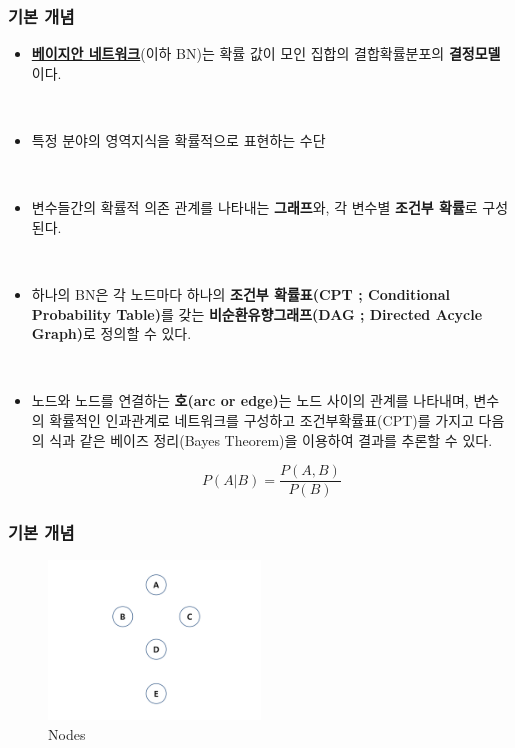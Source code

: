 \documentclass{beamer}
\begin{document}
\begin{frame}
\frametitle{기본 개념}
{\scriptsize{}
	\begin{itemize}

		\item \underline{\textbf{베이지안 네트워크}}(이하 BN)는 확률 값이 모인 집합의 결합확률분포의 \textcolor[rgb]{1.00,0.00,0.00}{\textbf{결정모델}}이다.

		{}\

		\item 특정 분야의 영역지식을 확률적으로 표현하는 수단
		
		{}\		
		
		\item 변수들간의 확률적 의존 관계를 나타내는 \textcolor[rgb]{1.00,0.00,0.00}{\textbf{그래프}}와, 각 변수별 \textcolor[rgb]{1.00,0.00,0.00}{\textbf{조건부 확률}}로 구성된다.

		{}\

		\item 하나의 BN은 각 노드마다 하나의 \textcolor[rgb]{1.00,0.00,0.00}{\textbf{조건부 확률표(CPT ; Conditional Probability Table)}}를 갖는 \textcolor[rgb]{1.00,0.00,0.00}{\textbf{비순환유향그래프(DAG ; Directed Acycle Graph)}}로 정의할 수 있다.

		{}\

		\item 노드와 노드를 연결하는 \textcolor[rgb]{1.00,0.00,0.00}{\textbf{호(arc or edge)}}는 노드 사이의 관계를 나타내며, 변수의 확률적인 인과관계로 네트워크를 구성하고 조건부확률표(CPT)를 가지고 다음의 식과 같은 베이즈 정리(Bayes Theorem)을 이용하여 결과를 추론할 수 있다.
		
		$$P(A|B)=\frac{P(A,B)}{P(B)}$$		
	\end{itemize}
}
\end{frame}



\begin{frame}
\frametitle{기본 개념}

	\begin{figure}
		\includegraphics[height=120pt]{images/image91}
		\caption{\scriptsize{}{Nodes}}
	\end{figure}

\end{frame}
\end{document}
